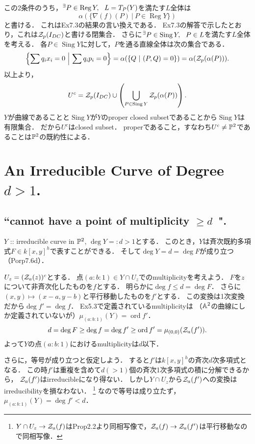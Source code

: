 \documentclass[a4paper]{jsarticle}
\newcommand{\Reg}{\operatorname{Reg}}
\newcommand{\Sing}{\operatorname{Sing}}
\newcommand{\ord}{\operatorname{ord}}
\begin{document}
    この2条件のうち，$\Exists{P \in \Reg Y} L=T_P(Y)$を満たす$L$全体は
    \[ \alpha(\{ \nabla(f)(P) ~|~ P \in \Reg Y \}) \]と書ける．
    これはEx7.3の結果の言い換えである．
    Ex7.3の解答で示したとおり，これは$\mathcal{Z}_p(I_{DC})$と書ける閉集合．
    さらに$\Exists{P \in \Sing Y} P \in L$を満たす$L$全体を考える．
    各$P \in \Sing Y$に対して，$P$を通る直線全体は次の集合である．
    \[ \left\{ \sum q_ix_i=0 ~\middle|~ \sum q_ip_i=0 \right\}=\alpha(\{ Q ~|~ (P,Q)=0 \})=\alpha(\mathcal{Z}_p(\alpha(P))). \]
    以上より，
    \[ U^c=\zerosp(I_{DC}) \cup \left( \bigcup_{P \in \Sing Y} \zerosp(\alpha(P)) \right). \]
    $Y$が曲線であることと$\Sing Y$が$Y$のproper closed subsetであることから$\Sing Y$は有限集合．
    だから$U^c$はclosed subset．
    properであること，すなわち$U^c \neq \mathbb{P}^2$であることは$\mathbb{P}^2$の既約性による．

\section{An Irreducible Curve of Degree $d > 1$.} %
    \subsection{``cannot have a point of multiplicity $\geq d$~".}
    $Y$ :: irreducible curve in $\mathbb{P}^2$, $\deg Y=:d>1$とする．
    このとき，$Y$は斉次既約多項式$F \in k[x,y]^h$で表すことができる．
    そして$\deg Y=d=\deg F$が成り立つ（Porp7.6d）．

    $U_z=(\mathcal{Z}_a(z))^c$とする．
    点$(a:b:1) \in Y \cap U_z$でのmultiplicityを考えよう．
    $F$を$z$について非斉次化したものを$f$とする．
    明らかに$\deg f \leq d=\deg F$．
    さらに$(x,y) \mapsto (x-a, y-b)$と平行移動したものを$f'$とする．
    この変換は1次変換だから$\deg f'=\deg f$．
    Ex5.3で定義されているmultiplicityは
    （$\mathbb{A}^2$の曲線にしか定義されていないが）$\mu_{(a:b:1)}(Y)=\ord f'$．
    \[ d=\deg F \geq \deg f=\deg f' \geq \ord f'=\mu_{(0,0)}(\zerosa(f')). \]
    よって$Y$の点$(a:b:1)$におけるmultiplicityは$d$以下．

    さらに，等号が成り立つと仮定しよう．
    すると$f'$は$k[x,y]^h$の斉次$d$次多項式となる．
    この時$f'$は重複を含めて$d(>1)$個の斉次1次多項式の積に分解できるから，
    $\mathcal{Z}_a(f')$はirreducibleになり得ない．
    しかし$Y \cap U_z$から$\mathcal{Z}_a(f')$への変換はirreducibilityを損なわない．
    \footnote{$Y \cap U_z \to \mathcal{Z}_a(f)$はProp2.2より同相写像で，$\mathcal{Z}_a(f) \to \mathcal{Z}_a(f')$は平行移動なので同相写像．}
    なので等号は成り立たず，$\mu_{(a:b:1)}(Y)=\deg f'<d$．
\end{document}
